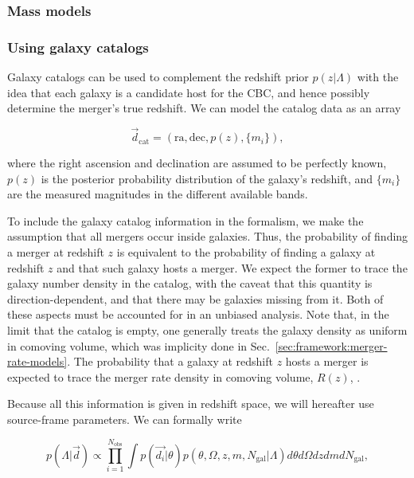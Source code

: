 \documentclass[%
preprint,
nofootinbib,
 amsmath,amssymb,
 aps,
]{revtex4-2}
\newcommand{\given}[2]{p( #1 | #2 )}
\newcommand{\nobs}[0]{N_{\text{obs}}}
\newcommand{\bv}[1]{{\color{red}{[BV: #1]}}}
\begin{document}
\subsubsection{Mass models}

\bv{TODO}

\subsubsection{Using galaxy catalogs}

Galaxy catalogs can be used to complement the redshift prior $\given{z}{\Lambda}$ with the idea
that each galaxy is a candidate host for the CBC, and hence possibly determine the merger's true
redshift. We can model the catalog data as an array

\begin{equation}
	\vec{d}_\text{cat} = (\text{ra}, \text{dec}, p(z), \{m_i\}),
\end{equation}

where the right ascension and declination are assumed to be perfectly known, $p(z)$ is the
posterior probability distribution of the galaxy's redshift, and $\{m_i\}$ are the measured
magnitudes in the different available bands.

To include the galaxy catalog information in the formalism, we make the assumption that all mergers
occur inside galaxies. Thus, the probability of finding a merger at redshift $z$ is equivalent to
the probability of finding a galaxy at redshift $z$ and that such galaxy hosts a merger. We expect
the former to trace the galaxy number density in the catalog, with the caveat that this quantity is
direction-dependent, and that there may be galaxies missing from it. Both of these aspects must be
accounted for in an unbiased analysis. Note that, in the limit that the catalog is empty, one
generally treats the galaxy density as uniform in comoving volume, which was implicity done in
Sec.~\ref{sec:framework:merger-rate-models}. The probability that a galaxy at redshift $z$ hosts a
merger is expected to trace the merger rate density in comoving volume, $R(z)$, \bv{modulo a
	transformation to source-frame time}.

Because all this information is given in redshift space, we will hereafter use source-frame
parameters. We can formally write

\begin{equation}
	\given{\Lambda}{\vec{d}} \propto \prod_{i=1}^{\nobs} \int \given{\vec{d_i}}{\theta} \given{\theta, \Omega, z, m, N_\text{gal}}{\Lambda} d\theta d\Omega dz dm dN_\text{gal},
\end{equation}
\end{document}

